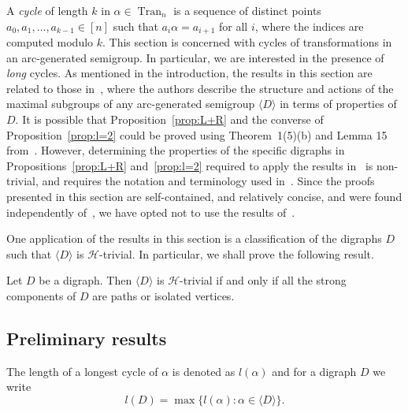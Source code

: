 \documentclass[ALCO,ThmDefs,Unicode,epreuves]{cedram}
\DeclareMathOperator{\Tran}{Tran}
\newcommand{\genset}[1]{\langle#1\rangle}
\newcommand{\Hcal}{\mathcal{H}}
\newcommand{\nset}{[n]}
\begin{document}
A \emph{cycle} of length $k$ in $\alpha\in \Tran_n$ is a sequence of distinct
points $a_0, a_1, \dots, a_{k-1}\in\nset$ such that $a_i \alpha = a_{i+1}$ for
all $i$, where the indices are computed modulo $k$. This section is concerned
with cycles of transformations in an arc-generated semigroup. In particular,
we are interested in the presence of \emph{long} cycles. As mentioned in the
introduction, the results in this section are related to those in~\cite{Horvath2017aa},
where the authors describe the structure and actions of the maximal subgroups
of any arc-generated semigroup $\genset{D}$ in terms of properties of $D$.
It is possible that Proposition~\ref{prop:L+R} and the converse of Proposition~\ref{prop:l=2} could
be proved using Theorem~1(5)(b) and Lemma 15 from~\cite{Horvath2017aa}. However,
determining the properties of the specific digraphs in
Propositions~\ref{prop:L+R} and~\ref{prop:l=2} required to apply the results
in~\cite{Horvath2017aa} is non-trivial, and requires the notation and terminology used
in~\cite{Horvath2017aa}. Since the proofs presented in this section are
self-contained, and relatively concise, and were found independently
of~\cite{Horvath2017aa}, we have opted not to use the results of~\cite{Horvath2017aa}.

One application of the results in this section is a classification of the
digraphs $D$ such that $\genset{D}$ is $\Hcal$-trivial. In particular, we shall
prove the following result. 
\begin{proposition} \label{prop:H-trivial}
 Let $D$ be a digraph. Then $\genset{D}$ is $\Hcal$-trivial if and only if all
 the strong components of $D$ are paths or isolated vertices.
\end{proposition}


\subsection{Preliminary results}
The length of a longest cycle of $\alpha$ is denoted as $l(\alpha)$ and for a
digraph $D$ we write
\[l(D) = \max \{ l(\alpha) : \alpha \in \genset{D} \}.\]
\end{document}

